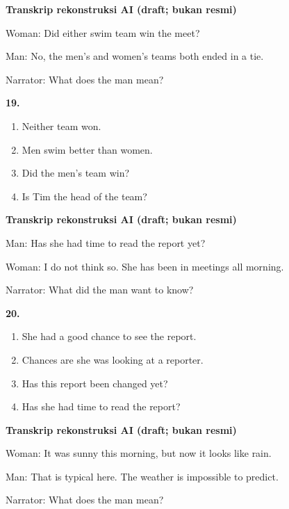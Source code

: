 \documentclass[12pt]{article}
\begin{document}
\par
\vspace{0.25\baselineskip}
\begin{exampleblock}
\textbf{Transkrip rekonstruksi AI (draft; bukan resmi)}\par
Woman: Did either swim team win the meet?\par
Man: No, the men's and women's teams both ended in a tie.\par
Narrator: What does the man mean?\par
\end{exampleblock}
\noindent\textbf{19.}
\begin{enumerate}[label=(\Alph*),leftmargin=*,itemsep=0.2em]
\item Neither team won.
\item Men swim better than women.
\item Did the men's team win?
\item Is Tim the head of the team?
\end{enumerate}
\par
\vspace{0.25\baselineskip}
\begin{exampleblock}
\textbf{Transkrip rekonstruksi AI (draft; bukan resmi)}\par
Man: Has she had time to read the report yet?\par
Woman: I do not think so. She has been in meetings all morning.\par
Narrator: What did the man want to know?\par
\end{exampleblock}
\noindent\textbf{20.}
\begin{enumerate}[label=(\Alph*),leftmargin=*,itemsep=0.2em]
\item She had a good chance to see the report.
\item Chances are she was looking at a reporter.
\item Has this report been changed yet?
\item Has she had time to read the report?
\end{enumerate}
\par
\vspace{0.25\baselineskip}
\begin{exampleblock}
\textbf{Transkrip rekonstruksi AI (draft; bukan resmi)}\par
Woman: It was sunny this morning, but now it looks like rain.\par
Man: That is typical here. The weather is impossible to predict.\par
Narrator: What does the man mean?\par
\end{exampleblock}
\end{document}
